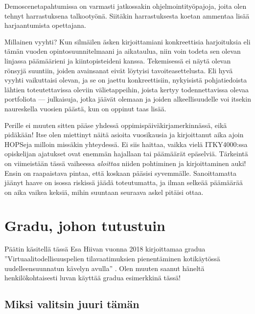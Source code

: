 \documentclass[utf8]{gradu3}
\begin{document}
Demoscenetapahtumissa on varmasti jatkossakin ohjelmointityöpajoja, joita olen
tehnyt harrastuksena talkootyönä. Siitäkin harrastuksesta koetan ammentaa lisää
harjaantumista opettajana.

Millainen vyyhti? Kun silmäilen äsken kirjoittamiani konkreettisia harjoituksia
eli tämän vuoden opintosuunnitelmaani ja aikataulua, niin voin todeta sen olevan
linjassa päämäärieni ja kiintopisteideni kanssa. Tekemisessä ei näytä olevan
rönsyjä suuntiin, joiden avainsanat eivät löytyisi tavoiteasettelusta. Eli hyvä
vyyhti vaikuttaisi olevan, ja se on jaettu konkreettisiin, nykyisistä
pohjatiedoista lähtien toteutettavissa oleviin välietappeihin, joista kertyy
todennettavissa olevaa portfoliota --- julkaisuja, jotka jäävät olemaan ja
joiden alkeellisuudelle voi itsekin naureskella vuosien päästä, kun on oppinut
taas lisää.

Perille ei muuten sitten pääse yhdessä oppimispäiväkirjamerkinnässä, eikä
pidäkään! Itse olen miettinyt näitä asioita vuosikausia ja kirjoittanut aika
ajoin HOPSeja milloin missäkin yhteydessä. Ei siis haittaa, vaikka vielä
ITKY4000:ssa opiskelijan ajatukset ovat enemmän hajallaan tai päämäärät
epäselviä. Tärkeintä on viimeistään tässä vaiheessa \emph{aloittaa} niiden
pohtiminen ja kirjoittaminen auki! Ensin on raapaistava pintaa, että koskaan
pääsisi syvemmälle. Sanoittamatta jäänyt haave on isossa riskissä jäädä
toteutumatta, ja ilman selkeää päämäärää on aika vaikea keksiä, mihin suuntaan
seuraava askel pitäisi ottaa.



\section{Gradu, johon tutustuin}

Päätin käsitellä tässä Esa Hiivan vuonna 2018 kirjoittamaa gradua
''Virtuaalitodellisuuspelien tilavaatimuksien pienentäminen kotikäytössä
uudelleensuunnatun kävelyn avulla'' \parencite{Hiiva2018vr}. Olen muuten saanut
häneltä henkilökohtaisesti luvan käyttää gradua esimerkkinä tässä!

\subsection{Miksi valitsin juuri tämän}
\end{document}
